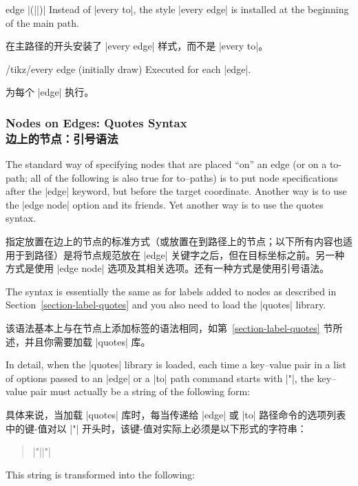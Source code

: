 \begin{pathoperation}{edge}{  |(||)|}
    Instead of |every to|, the style |every edge| is installed at the beginning
    of the main path.
    
    在主路径的开头安装了 |every edge| 样式，而不是 |every to|。

    \begin{stylekey}{/tikz/every edge (initially draw)}
        Executed for each |edge|.

        为每个 |edge| 执行。

\begin{codeexample}[]
\end{codeexample}
    \end{stylekey}
\end{pathoperation}


\subsubsection{Nodes on Edges: Quotes Syntax\\边上的节点：引号语法}
\label{section-edge-quotes}

The standard way of specifying nodes that are placed ``on'' an edge (or on a
to-path; all of the following is also true for to--paths) is to put node
specifications after the |edge| keyword, but before the target coordinate.
Another way is to use the |edge node| option and its friends. Yet another way
is to use the quotes syntax.

指定放置在边上的节点的标准方式（或放置在到路径上的节点；以下所有内容也适用于到路径）是将节点规范放在 |edge| 关键字之后，但在目标坐标之前。另一种方式是使用 |edge node| 选项及其相关选项。还有一种方式是使用引号语法。

The syntax is essentially the same as for labels added to nodes as described in
Section~\ref{section-label-quotes} and you also need to load the |quotes|
library.

该语法基本上与在节点上添加标签的语法相同，如第~\ref{section-label-quotes} 节所述，并且你需要加载 |quotes| 库。

In detail, when the |quotes| library is loaded, each time a key--value pair in
a list of options passed to an |edge| or a |to| path command starts with |"|,
the key--value pair must actually be a string of the following form:

具体来说，当加载 |quotes| 库时，每当传递给 |edge| 或 |to| 路径命令的选项列表中的键-值对以 |"| 开头时，该键-值对实际上必须是以下形式的字符串：
%
\begin{quote}
    |"||"|
\end{quote}
%
This string is transformed into the following:

